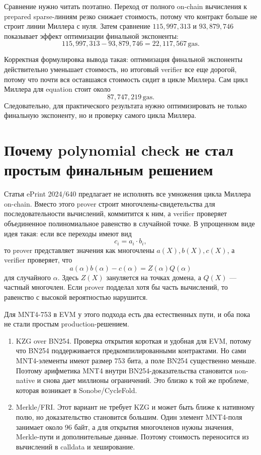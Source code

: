 \documentclass[12pt,a4paper]{article}
\newcommand{\gas}{\,\mathrm{gas}}
\begin{document}
Сравнение нужно читать поэтапно. Переход от полного on-chain вычисления к prepared sparse-линиям резко снижает стоимость, потому что контракт больше не строит линии Миллера с нуля. Затем сравнение \(115{,}997{,}313\) и \(93{,}879{,}746\) показывает эффект оптимизации финальной экспоненты:
\[
    115{,}997{,}313 - 93{,}879{,}746 = 22{,}117{,}567\gas.
\]

Корректная формулировка вывода такая: оптимизация финальной экспоненты действительно уменьшает стоимость, но итоговый verifier все еще дорогой, потому что почти вся оставшаяся стоимость сидит в цикле Миллера. Сам цикл Миллера для equation стоит около
\[
    87{,}747{,}219\gas.
\]
Следовательно, для практического результата нужно оптимизировать не только финальную экспоненту, но и проверку самого цикла Миллера.

\section{Почему polynomial check не стал простым финальным решением}

Статья ePrint 2024/640 предлагает не исполнять все умножения цикла Миллера on-chain. Вместо этого prover строит многочлены-свидетельства для последовательности вычислений, коммитится к ним, а verifier проверяет объединенное полиномиальное равенство в случайной точке. В упрощенном виде идея такая: если все переходы имеют вид
\[
    c_i = a_i\cdot b_i,
\]
то prover представляет значения как многочлены \(a(X),b(X),c(X)\), а verifier проверяет, что
\[
    a(\alpha)b(\alpha)-c(\alpha)=Z(\alpha)Q(\alpha)
\]
для случайного \(\alpha\). Здесь \(Z(X)\) зануляется на точках домена, а \(Q(X)\) --- частный многочлен. Если prover подделал хотя бы часть вычислений, то равенство с высокой вероятностью нарушится.

Для MNT4-753 в EVM у этого подхода есть два естественных пути, и оба пока не стали простым production-решением.

\begin{enumerate}
    \item KZG over BN254. Проверка открытия короткая и удобная для EVM, потому что BN254 поддерживается предкомпилированными контрактами. Но сами MNT4-элементы имеют размер 753 бита, а поле BN254 существенно меньше. Поэтому арифметика MNT4 внутри BN254-доказательства становится non-native и снова дает миллионы ограничений. Это близко к той же проблеме, которая возникает в Sonobe/CycleFold.
    \item Merkle/FRI. Этот вариант не требует KZG и может быть ближе к нативному полю, но доказательство становится большим. Один элемент MNT4-поля занимает около 96 байт, а для открытия многочленов нужны значения, Merkle-пути и дополнительные данные. Поэтому стоимость переносится из вычислений в calldata и хеширование.
\end{enumerate}
\end{document}
